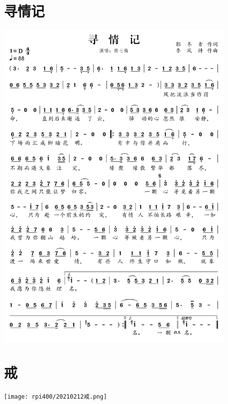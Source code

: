 \documentclass[cn,pad,twocol]{elegantbook}
\begin{document}
\section{寻情记} \includegraphics[width=0.9\textwidth]{rpi400/20210212寻情记.png}
\section{戒} \texttt{[image: rpi400/20210212戒.png]}
\end{document}
